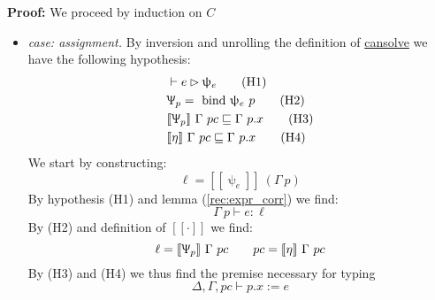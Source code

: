 \documentclass[12pt,a4paper,twoside]{book}
\newcommand{\llbracket}{[\![}
\newcommand{\rrbracket}{]\!]}
\begin{document}
\noindent\textbf{Proof:}
We proceed by induction on $C$
\begin{itemize}
\item\emph{case: assignment.} By inversion and unrolling the definition of \underline{cansolve} we have the following hypothesis:
\begin{align}
&\vdash e \rhd \uppsi_e \tag{H1}\\
&\Uppsi_p =~\text{bind}~\uppsi_e~p\tag{H2}\\
&\llbracket \Uppsi_p\rrbracket~\Gamma~pc \sqsubseteq \Gamma~p.x\tag{H3}\\
&\llbracket \eta\rrbracket~\Gamma~pc \sqsubseteq \Gamma~p.x \tag{H4}
\end{align}
We start by constructing:
$$
\ell = \llbracket \uppsi_e \rrbracket~(\Gamma~p)
$$
By hypothesis (H1) and lemma (\ref{rec:expr_corr}) we find:
$$
\Gamma~p\vdash e:\ell
$$
By (H2) and definition of $\llbracket \cdot \rrbracket$ we find:
$$
\ell = \llbracket \Uppsi_p \rrbracket~\Gamma~pc
\quad\quad pc = \llbracket \eta \rrbracket~\Gamma~pc
$$
By (H3) and (H4) we thus find the premise necessary for typing
$$
\Delta, \Gamma, pc \vdash p.x := e
$$


\end{itemize}
\end{document}
